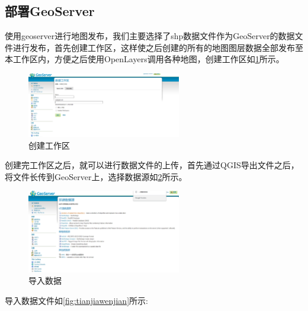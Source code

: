 \subsection{部署GeoServer}
使用geoserver进行地图发布，我们主要选择了shp数据文件作为GeoServer的数据文件进行发布，首先创建工作区，这样使之后创建的所有的地图图层数据全部发布至本工作区内，方便之后使用OpenLayers调用各种地图，创建工作区如\ref{fig:gongzuoqu}所示。
\begin{figure}[!htb]%
	\centering
	\includegraphics[width=0.60\textwidth]{figs/创建工作区.png}
	\caption{创建工作区}
	\label{fig:gongzuoqu}
\end{figure}
创建完工作区之后，就可以进行数据文件的上传，首先通过QGIS导出文件之后，将文件长传到GeoServer上，选择数据源如\ref{fig:xinjianshuju}所示。
\begin{figure}[!htb]%
	\centering
	\includegraphics[width=0.60\textwidth]{figs/新建数据.png}
	\caption{导入数据}
	\label{fig:xinjianshuju}
\end{figure}

导入数据文件如\ref{fig:tianjiawenjian}所示:

